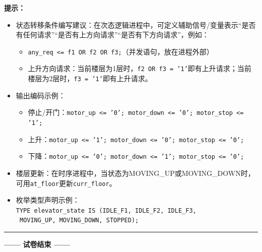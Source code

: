 \begin{framed}
\textbf{提示：}
\begin{itemize}
  \item 状态转移条件编写建议：在次态逻辑进程中，可定义辅助信号/变量表示“是否有任何请求”“是否有上方向请求”“是否有下方向请求”，例如：
  \begin{itemize}
    \item \texttt{any\_req <= f1 OR f2 OR f3;}（并发语句，放在进程外部）
    \item 上升方向请求：当前楼层为1层时，\texttt{f2 OR f3 = '1'}即有上升请求；当前楼层为2层时，\texttt{f3 = '1'}即有上升请求。
  \end{itemize}
  \item 输出编码示例：
  \begin{itemize}
    \item 停止/开门：\texttt{motor\_up <= '0'; motor\_down <= '0'; motor\_stop <= '1';}
    \item 上升：\texttt{motor\_up <= '1'; motor\_down <= '0'; motor\_stop <= '0';}
    \item 下降：\texttt{motor\_up <= '0'; motor\_down <= '1'; motor\_stop <= '0';}
  \end{itemize}
  \item 楼层更新：在时序进程中，当状态为MOVING\_UP或MOVING\_DOWN时，可用\texttt{at\_floor}更新\texttt{curr\_floor}。
  \item 枚举类型声明示例：\\[2pt]
  \texttt{TYPE elevator\_state IS (IDLE\_F1, IDLE\_F2, IDLE\_F3,}\\
  \texttt{\qquad\qquad\qquad\qquad\; MOVING\_UP, MOVING\_DOWN, STOPPED);}
\end{itemize}
\end{framed}

\vspace{0.8cm}
{\centering
\rule{0.8\textwidth}{0.5pt}
\vspace{0.3cm}

\textbf{—— 试卷结束 ——}

\vspace{0.5cm}}

\endinput
